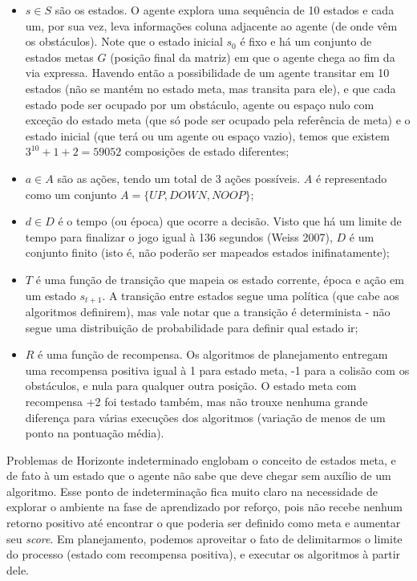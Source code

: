 \documentclass[letterpaper]{article} %
\begin{document}
\begin{itemize}

\item $s \in S$ são os estados. O agente explora uma sequência de 10 estados e cada um, por sua vez, leva informações coluna adjacente ao agente (de onde vêm os obstáculos). Note que o estado inicial $s_0$ é fixo e há um conjunto de estados metas $G$ (posição final da matriz) em que o agente chega ao fim da via expressa. Havendo então a possibilidade de um agente transitar em 10 estados (não se mantém no estado meta, mas transita para ele), e que cada estado pode ser ocupado por um obstáculo, agente ou espaço nulo com exceção do estado meta (que só pode ser ocupado pela referência de meta) e o estado inicial (que terá ou um agente ou espaço vazio), temos que existem $3^{10} + 1 + 2 = 59052$ composições de estado diferentes;

\item $a \in A$ são as ações, tendo um total de 3 ações possíveis. $A$ é representado como um conjunto $A = \{UP, DOWN, NOOP\}$;

\item $d \in D$ é o tempo (ou época) que ocorre a decisão. Visto que há um limite de tempo para finalizar o jogo igual à 136 segundos (Weiss 2007), $D$ é um conjunto finito (isto é, não poderão ser mapeados estados inifinatamente);

\item $T$ é uma função de transição que mapeia os estado corrente, época e ação em um estado $s_{t+1}$. A transição entre estados segue uma política (que cabe aos algoritmos definirem), mas vale notar que a transição é determinista - não segue uma distribuição de probabilidade para definir qual estado ir;

\item $R$ é uma função de recompensa. Os algoritmos de planejamento entregam uma recompensa positiva igual à 1 para estado meta, -1 para a colisão com os obstáculos, e nula para qualquer outra posição. O estado meta com recompensa +2 foi testado também, mas não trouxe nenhuma grande diferença para várias execuções dos algoritmos (variação de menos de um ponto na pontuação média).

\end{itemize}

Problemas de Horizonte indeterminado englobam o conceito de estados meta, e de fato à um estado que o agente não sabe que deve chegar sem auxílio de um algoritmo. Esse ponto de indeterminação fica muito claro na necessidade de explorar o ambiente na fase de aprendizado por reforço, pois não recebe nenhum retorno positivo até encontrar o que poderia ser definido como meta e aumentar seu \textit{score}. Em planejamento, podemos aproveitar o fato de delimitarmos o limite do processo (estado com recompensa positiva), e executar os algoritmos à partir dele.
\end{document}

